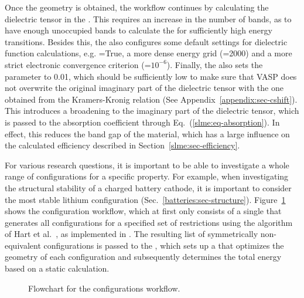 \begin{refsection}
Once the geometry is obtained, the workflow continues by calculating the 
dielectric tensor in the . This requires an increase in the 
number of bands, as to have enough unoccupied bands to calculate the 
 for sufficiently high energy 
transitions. Besides this, the  also configures some default 
settings for dielectric function calculations, e.g. =True, a 
more dense energy grid (=2000) and a more strict electronic 
convergence criterion (=$10^{-6}$). Finally, the  
also sets the  parameter to 0.01, which should be sufficiently low to make sure 
that \gls{VASP} does not overwrite the original imaginary part of the 
dielectric tensor with the one obtained from the Kramers-Kronig relation (See Appendix~\ref{appendix:sec-cshift}). This 
introduces a broadening to the imaginary part of the dielectric tensor, which 
is passed to the absorption coefficient through 
Eq.~(\ref{slme:eq-absorption}). In effect, this reduces the band gap of the 
material, which has a large influence on the calculated efficiency described 
in Section~\ref{slme:sec-efficiency}. 
 
\clearpage
{} 
 
For various research questions, it is important to be able to investigate a 
whole range of configurations for a specific property. For example, when 
investigating the structural stability of a charged battery cathode, it is 
important to consider the most stable lithium 
configuration (Sec.~\ref{batteries:sec-structure}). 
Figure~\ref{automation:fig-configurations} shows the configuration workflow, 
which at first only consists of a single  that generates all 
configurations for a specified set of restrictions using the algorithm of Hart 
et al.~\cite{Hart2005}, as implemented in 
. The 
resulting list of symmetrically non-equivalent configurations is passed to the 
, which sets up a 
 that optimizes the geometry of each configuration and 
subsequently determines the total energy based on a static calculation. 
 
\begin{figure}[ht] 
\centering 
 
\caption{\label{automation:fig-configurations} Flowchart for the 
configurations workflow.} 
\end{figure} 
 

\end{refsection}
